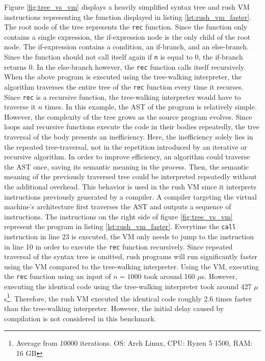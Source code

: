 Figure \ref{fig:tree_vs_vm} displays a heavily simplified syntax tree and rush VM instructions representing the function displayed in listing \ref{lst:rush_vm_faster}.
The root node of the tree represents the \texttt{rec} function.
Since the function only contains a single expression, the if-expression node is the only child of the root node.
The if-expression contains a condition, an if-branch, and an else-branch.
Since the function should not call itself again if \texttt{n} is equal to 0, the if-branch returns 0.
In the else-branch however, the \texttt{rec} function calls itself recursively.
When the above program is executed using the tree-walking interpreter, the algorithm traverses the entire tree of the \texttt{rec} function every time it recurses.
Since \texttt{rec} is a recursive function, the tree-walking interpreter would have to traverse it $n$ times.
In this example, the AST of the program is relatively simple.
However, the complexity of the tree grows as the source program evolves.
Since loops and recursive functions execute the code in their bodies repeatedly, the tree traversal of the body presents an inefficiency.
Here, the inefficiency solely lies in the repeated tree-traversal, not in the repetition introduced by an iterative or recursive algorithm.
In order to improve efficiency, an algorithm could traverse the AST once, saving its semantic meaning in the process.
Then, the semantic meaning of the previously traversed tree could be interpreted repeatedly without the additional overhead.
This behavior is used in the rush VM since it interprets instructions previously generated by a compiler.
A compiler targeting the virtual machine's architecture first traverses the AST and outputs a sequence of instructions.
The instructions on the right side of figure \ref{fig:tree_vs_vm} represent the program in listing \ref{lst:rush_vm_faster}.
Everytime the \texttt{call} instruction in line 23 is executed, the VM only needs to jump to the instruction in line 10 in order to execute the \texttt{rec} function recursively.
Since repeated traversal of the syntax tree is omitted, rush programs will run significantly faster using the VM compared to the tree-walking interpreter.
Using the VM, executing the \texttt{rec} function using an input of $n = 1000$ took around 160 $\mu$s.
However, executing the identical code using the tree-walking interpreter took around 427 $\mu$s\footnote{Average from 10000 iterations. OS: Arch Linux, CPU: Ryzen 5 1500, RAM: 16 GB}.
Therefore, the rush VM executed the identical code roughly 2.6 times faster than the tree-walking interpreter.
However, the initial delay caused by compilation is not considered in this benchmark.

